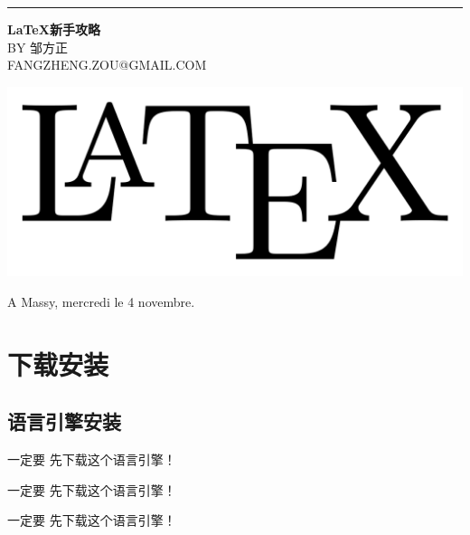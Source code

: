 \documentclass[12pt,a4paper,oneside]{book}
\newcommand{\yihao}{\fontsize{26pt}{\baselineskip}\selectfont}%
\newcommand{\sihao}{\fontsize{14pt}{\baselineskip}\selectfont}%
\newcommand{\drop}{ 0.08\textheight}
\begin{document}
 \sihao
\begin{minipage}{0.2\textwidth}
%
\hspace*{0.2\textwidth}\textcolor[RGB]{16,136,136}{\rule{6pt}{\textheight}}
\end{minipage}
\hfill
\begin{minipage}{0.8\textwidth}

\thispagestyle{empty}
\par
\par

\vspace*{0.2\textwidth}
\hspace*{0.3\textwidth}
{\bfseries \yihao \bkmo\textcolor[RGB]{181,72,61}{\LaTeX 新手攻略}}\\[\drop]
\vspace*{0.02\textwidth}
\hspace*{0.6\textwidth}
BY {\sihao\bkmo 邹方正}\\
\vspace*{0.02\textwidth}
\hspace*{0.3\textwidth}
{\small \deja \textcolor[RGB]{20,144,188}{FANGZHENG.ZOU@GMAIL.COM}}\\
\vfill
\begin{center}
\includegraphics[scale=0.15]{Figures/latex.png}
\end{center}
\vspace*{0.1\textwidth}
\begin{center}
A Massy, mercredi le 4 novembre.
\end{center}
\end{minipage}
\restoregeometry
\setcounter{page}{1}
\tableofcontents

\newpage
\setcounter{page}{1}
\chapter{下载安装}



\section{语言引擎安装}
一定要 \textcolor[RGB]{255,0,51} {先下载}这个语言引擎！
\par
一定要 \textcolor[RGB]{255,0,51} {先下载}这个语言引擎！
\par
一定要 \textcolor[RGB]{255,0,51} {先下载}这个语言引擎！
\par
\end{document}

